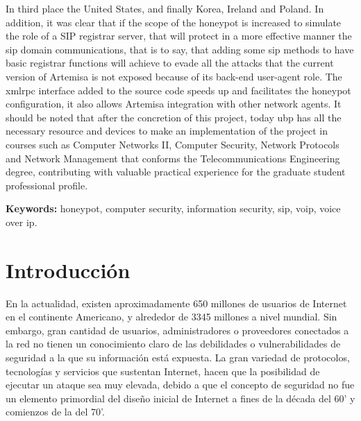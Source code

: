 \documentclass[a4paper,12pt]{report}
\begin{document}
In third place the United States, and finally Korea, Ireland and Poland. In addition, it was clear that 
if the scope of the honeypot is increased to simulate the role of a SIP registrar server, that will 
protect in a more effective manner the \ac{sip} domain communications, that is to say, that adding 
some \ac{sip} methods to have basic registrar functions will achieve to evade all the attacks that 
the current version of Artemisa is not exposed because of its back-end user-agent role. The \ac{xmlrpc}
interface added to the source code speeds up and facilitates the honeypot configuration, it also allows 
Artemisa integration with other network agents. It should be noted that after the concretion of this 
project, today \ac{ubp} has all the necessary resource and devices to make an implementation of the 
project in courses such as Computer Networks II, Computer Security, Network Protocols and Network 
Management that conforms the Telecommunications Engineering degree, contributing with valuable 
practical experience for the graduate student professional profile.

\begin{flushleft}
\textbf{Keywords:} honeypot, computer security, information security, \ac{sip}, \ac{voip}, voice over ip.
\end{flushleft}

\thispagestyle{empty}

\newpage


\setcounter{page}{5}

\tableofcontents
\listoffigures
\listoftables
\setcounter{secnumdepth}{3}

\newpage
{}

\chapter{Introducci\'on}


En la actualidad, existen aproximadamente 650 millones de usuarios de
Internet en el continente Americano, y alrededor de 3345 millones a
nivel mundial. \cite{inetworld} Sin
embargo, gran cantidad de usuarios, administradores o proveedores
conectados a la red no tienen un conocimiento claro de las debilidades o
vulnerabilidades de seguridad a la que su información está expuesta. La
gran variedad de protocolos, tecnologías y servicios que sustentan
Internet, hacen que la posibilidad de ejecutar un ataque sea muy
elevada, debido a que el concepto de seguridad no fue un elemento
primordial del diseño inicial de Internet a fines de la década del 60’ y
comienzos de la del 70’.
\end{document}
